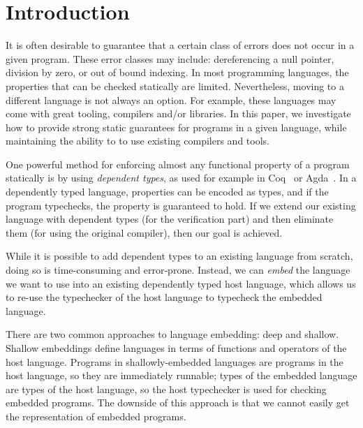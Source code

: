 \documentclass[sigplan,screen]{acmart}
\begin{document}
\section{Introduction}\label{sec:introduction}

It is often desirable to guarantee that a
certain class of errors does not occur in a given program.  These
error classes may include: dereferencing a null pointer, division
by zero, or out of bound indexing.  In most
programming languages, the properties that can be checked
statically are limited.  Nevertheless, moving to a different
language is not always an option.  For example, these languages may
come with great tooling, compilers and/or libraries.  In this paper, we
investigate how to provide strong static guarantees for programs in a
given language, while maintaining the ability to to use existing
compilers and tools.

One powerful method for enforcing almost any functional property of a
program statically is by using \emph{dependent types}, as used for
example in Coq~\cite{Coq-8-13-2} or Agda~\cite{agda-2-6-2}.  In a
dependently typed language, properties can be encoded as types, and if
the program typechecks, the property is guaranteed to hold.  If we
extend our existing language with dependent types (for the verification
part) and then eliminate them (for using the original compiler), then
our goal is achieved.

While it is possible to add dependent types to an existing language
from scratch, doing so is time-consuming and error-prone.  Instead,
we can \emph{embed} the language we want to use into an existing
dependently typed host language, which allows us to re-use the typechecker
of the host language to typecheck the embedded language.

There are two common approaches to language embedding: deep and shallow.
Shallow embeddings define lan\-gua\-ges in terms of functions and operators
of the host language.  Programs in shallowly-embedded languages are programs
in the host language, so they are immediately run\-nable; types of the embedded
language are types of the host language, so the host typechecker is used for
checking embedded programs.  The downside of this approach is that we cannot
easily get the representation of embedded programs.
\end{document}
